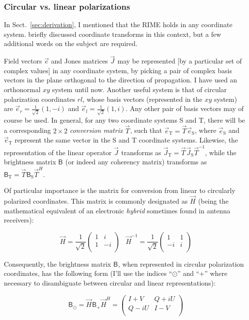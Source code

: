 \documentclass[]{aa}
\newcommand{\matrixtt}[4]{\left( \begin{array}{cc}#1&#2\\#3&#4\\\end{array} \right)}
\newcommand{\herm}{H}
\newcommand{\jones}[2]{\vec {#1}_{#2}}
\newcommand{\jonesinv}[2]{\vec {#1}^{-1}_{#2}}
\newcommand{\jonesT}[2]{\vec {#1}^{\herm}_{#2}}
\newcommand{\coh}[2]{\mathsf{{#1}}_{{#2}}}
\begin{document}
\subsubsection{\label{sec:circular}Circular vs. linear polarizations}

In Sect.~\ref{sec:derivation}, I mentioned that the RIME holds in any coordinate system. \citet{ME1} briefly 
discussed coordinate transforms in this context, but a few additional words on the subject are required.

Field vectors $\vec e$ and Jones matrices $\jones{J}{}$ may be represented [by a particular set of complex values] in any coordinate system, by picking a pair of complex basis vectors in the plane orthogonal to the direction of propagation. I have used an orthonormal $xy$ system until now. Another useful system is that of circular polarization coordinates $rl$, whose basis vectors (represented in the $xy$ system) are $\vec e_r=\frac{1}{\sqrt{2}}(1,-i)$ and $\vec e_l=\frac{1}{\sqrt{2}}(1,i)$. Any other pair of basis vectors may of course be used. In general, for any two coordinate systems S and T, there will be a corresponding $2\times2$ {\em conversion matrix} $\jones{T}{}$, such that $\vec e_\mathrm{T}=\jones{T}{} \vec e_\mathrm{S}$, where $\vec e_\mathrm{S}$ and $\vec e_\mathrm{T}$ represent the same vector in the S and T coordinate systems. Likewise, the representation of the linear operator $\jones{J}{}$ transforms as $\jones{J}{\mathrm{T}}=\jones{T}{} \jones{J}{\mathrm{S}} \jonesinv{T}{}$, while the brightness matrix $\coh{B}{}$ (or indeed any coherency matrix) transforms as $\coh{B}{\mathrm{T}}=\jones{T}{} \coh{B}{\mathrm{S}} \jonesT{T}{}.$

Of particular importance is the matrix for conversion from linear to circularly polarized coordinates. This matrix is commonly designated as $\jones{H}{}$ (being the mathematical equivalent of an electronic {\em hybrid} sometimes found in antenna receivers):

\[
\jones{H}{} = \frac{1}{\sqrt{2}} \matrixtt{1}{i}{1}{-i} \;\;\; \jonesinv{H}{} = \frac{1}{\sqrt{2}} \matrixtt{1}{1}{-i}{i}
\]

Consequently, the brightness matrix $\coh{B}{}$, when represented in circular polarization coordinates, has the following form (I'll use the indices ``$\odot$'' and ``$+$'' where necessary to disambiguate between circular and linear representations):

\[
\coh{B}{\odot} = \jones{H}{} \coh{B}{+} \jonesT{H}{} = \matrixtt{I+V}{Q+iU}{Q-iU}{I-V}
\]
\end{document}
